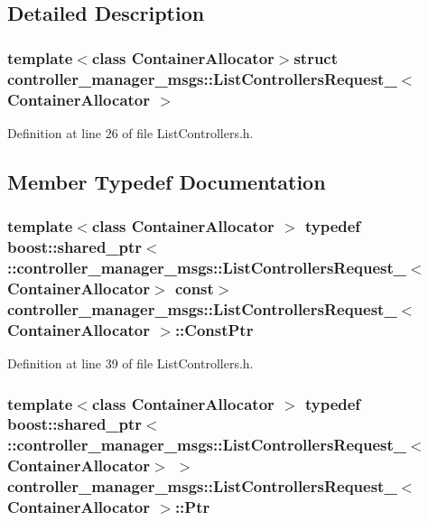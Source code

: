 \subsection{\-Detailed \-Description}
\subsubsection*{template$<$class Container\-Allocator$>$struct controller\-\_\-manager\-\_\-msgs\-::\-List\-Controllers\-Request\-\_\-$<$ Container\-Allocator $>$}



\-Definition at line 26 of file \-List\-Controllers.\-h.



\subsection{\-Member \-Typedef \-Documentation}
\subsubsection[{\-Const\-Ptr}]{\setlength{\rightskip}{0pt plus 5cm}template$<$class Container\-Allocator $>$ typedef boost\-::shared\-\_\-ptr$<$ \-::{\bf controller\-\_\-manager\-\_\-msgs\-::\-List\-Controllers\-Request\-\_\-}$<$\-Container\-Allocator$>$ const$>$ {\bf controller\-\_\-manager\-\_\-msgs\-::\-List\-Controllers\-Request\-\_\-}$<$ \-Container\-Allocator $>$\-::{\bf \-Const\-Ptr}}\label{structcontroller__manager__msgs_1_1ListControllersRequest___ac3a39c49b9fa8f53912aa41267bfa16e}


\-Definition at line 39 of file \-List\-Controllers.\-h.

\subsubsection[{\-Ptr}]{\setlength{\rightskip}{0pt plus 5cm}template$<$class Container\-Allocator $>$ typedef boost\-::shared\-\_\-ptr$<$ \-::{\bf controller\-\_\-manager\-\_\-msgs\-::\-List\-Controllers\-Request\-\_\-}$<$\-Container\-Allocator$>$ $>$ {\bf controller\-\_\-manager\-\_\-msgs\-::\-List\-Controllers\-Request\-\_\-}$<$ \-Container\-Allocator $>$\-::{\bf \-Ptr}}\label{structcontroller__manager__msgs_1_1ListControllersRequest___ad88afc04eb751d661a1194c6f2a1b91a}


